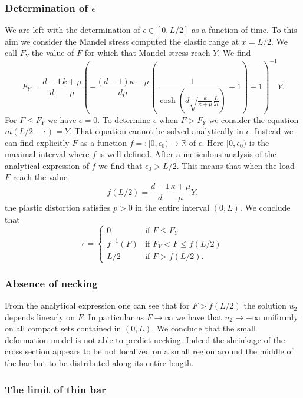 \documentclass[a4paper,10pt,twoside]{amsbook}
\numberwithin{section}{chapter}
\numberwithin{equation}{chapter}
\theoremstyle{definition}
\begin{document}
\subsubsection*{Determination of $\epsilon$}

We are left with the determination of $\epsilon\in[0,L/2]$ as a function of time. To this aim we consider the Mandel stress computed the elastic range at $x=L/2$. We call $F_Y$ the value of $F$ for which that Mandel stress reach $Y$. We find
\[
F_Y=\frac{d-1}{d}\frac{k+\mu}{\mu}\left(-\frac{(d-1)\kappa-\mu}{d\mu}\left(\frac{1}{\cosh\left(d\sqrt{\frac{\kappa}{\kappa+\mu}}\frac{L}{2l}\right)}-1\right)+1\right)^{-1}Y.
\]
For $F\le F_Y$ we have $\epsilon=0$. To determine $\epsilon$ when $F>F_Y$ we consider the equation $m(L/2-\epsilon)=Y$. That equation cannot be solved analytically in $\epsilon$. Instead we can find explicitly $F$ as a function $f=\colon[0,\epsilon_0)\to\mathbb{R}$ of $\epsilon$. Here $[0,\epsilon_0)$ is the maximal interval where $f$ is well defined. After a meticulous analysis of the analytical expression of $f$ we find that $\epsilon_0>L/2$. This means that when the load $F$ reach the value
\[
f(L/2)=\frac{d-1}{d}\frac{\kappa+\mu}{\mu}Y,
\]
the plastic distortion satisfies $p>0$ in the entire interval $(0,L)$. We conclude that
\[
\epsilon=\begin{cases}
0 & \text{if $F\le F_Y$} \\
f^{-1}(F) & \text{if $F_Y<F\le f(L/2)$} \\
L/2 & \text{if $F>f(L/2)$}.
\end{cases}
\]

\subsubsection*{Absence of necking}

From the analytical expression one can see that for $F>f(L/2)$ the solution $u_2$ depends linearly on $F$. In particular as $F\to\infty$ we have that $u_2\to-\infty$ uniformly on all compact sets contained in $(0,L)$. We conclude that the small deformation model is not able to predict necking. Indeed the shrinkage of the cross section appears to be not localized on a small region around the middle of the bar but to be distributed along its entire length.

\subsubsection*{The limit of thin bar}
\end{document}
